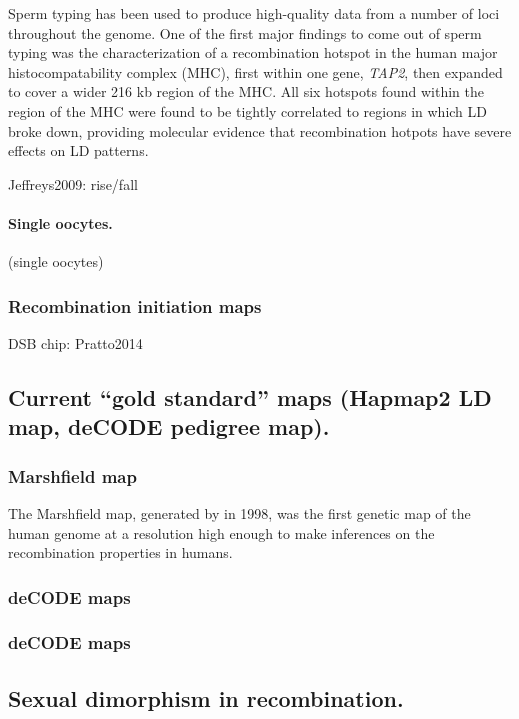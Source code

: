 Sperm typing has been used to produce high-quality data from a number of loci throughout the genome.
One of the first major findings to come out of sperm typing was the characterization of a recombination hotspot in the human major histocompatability complex (MHC), first within one gene, \textit{TAP2}\cite{Jeffreys2000}, then expanded to cover a wider 216 kb region of the MHC\cite{Jeffreys2001}.
All six hotspots found within the region of the MHC were found to be tightly correlated to regions in which LD broke down, providing molecular evidence that recombination hotpots have severe effects on LD patterns.


Jeffreys2009: rise/fall

\citet{Lu2012b}
\citet{Wang2012}


\paragraph{Single oocytes.}
\citet{Hou2013} (single oocytes)


\subsubsection{Recombination initiation maps}
DSB chip: Pratto2014

\subsection{Current ``gold standard'' maps (Hapmap2 LD map, deCODE pedigree map).}

\subsubsection{Marshfield map}
The Marshfield map, generated by \citet{Broman1998} in 1998, was the first genetic map of the human genome at a resolution high enough to make inferences on the recombination properties in humans.
\subsubsection{deCODE maps}
\subsubsection{deCODE maps}

\subsection{Sexual dimorphism in recombination.}
